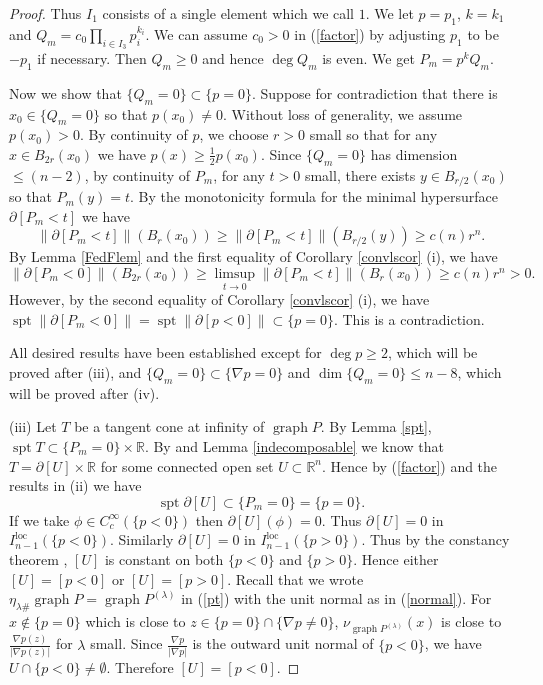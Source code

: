 \documentclass[pdflatex,sn-mathphys-num]{sn-jnl}%
\theoremstyle{thmstyleone}%
\theoremstyle{thmstyletwo}%
\theoremstyle{thmstylethree}%
\newcommand{\R}{\mathbb{R}}
\newcommand{\loc}{\mathrm{loc}}
\DeclareMathOperator{\spt}{spt}
\DeclareMathOperator{\graph}{graph}
\begin{document}
\begin{proof}
    
	Thus $I_1$ consists of a single element which we call $1$. We let $p=p_1$,  $k=k_1$ and $Q_m=c_0\prod_{i\in I_3}p_{i}^{k_{i}}$. We can assume $c_0>0$ in (\ref{factor}) by adjusting $p_1$ to be $-p_1$ if necessary. Then $Q_m\ge 0$ and hence $\deg Q_m$ is even. We get $P_m=p^kQ_m$.
	
	Now we show that $\{Q_m=0\}\subset \{p=0\}$. Suppose for contradiction that there is $x_0\in \{Q_m=0\}$ so that $p(x_0)\neq0$. Without loss of generality, we assume $p(x_0)>0$. By continuity of $p$, we choose $r>0$ small so that for any $x\in B_{2r}(x_0)$ we have $p(x)\ge \frac{1}{2}p(x_0)$. Since $\{Q_m=0\}$ has dimension $\le (n-2)$, by continuity of $P_m$, for any $t>0$ small, there exists $y\in B_{r/2}(x_0)$ so that $P_m(y)=t$. By the monotonicity formula for the minimal hypersurface $\partial [P_m<t]$ \cite[Theorem 17.6]{Sim} we have \[\|\partial [P_m<t]\|(B_r(x_0))\ge \|\partial [P_m<t]\|(B_{r/2}(y))\ge c(n)r^n.\]
	By Lemma \ref{FedFlem} and the first equality of Corollary \ref{convlscor} (i), we have
	\[\|\partial [P_m<0]\|(B_{2r}(x_0))\ge \limsup_{t\to0}\|\partial [P_m<t]\|(B_r(x_0))\ge c(n)r^n>0.\]
	However, by the second equality of Corollary \ref{convlscor} (i), we have $\spt \|\partial [P_m<0]\|=\spt \|\partial[p<0]\|\subset \{p=0\}$. This is a contradiction.
	
	
	All desired results have been established except for $\deg p \ge 2$, which will be proved after (iii), and $\{Q_m = 0\} \subset \{\nabla p = 0\}$ and $\dim \{Q_m=0\}\le n-8$, which will be proved after (iv).
	
	(iii) Let $T$ be a tangent cone at infinity of $\graph P$. By Lemma \ref{spt}, $\spt T\subset \{P_m=0\}\times \R$. By \cite[\S 2]{simon1987asymptotic} and Lemma \ref{indecomposable} we know that $T=\partial [U]\times \R$ for some connected open set $U\subset\R^n$. Hence by (\ref{factor}) and the results in (ii) we have \[\spt \partial [U]\subset \{P_m=0\}=\{p =0\}.\] If we take $\phi\in C_c^\infty(\{p <0\})$ then $\partial [U](\phi)=0$. Thus $\partial[U]=0$ in $I_{n-1}^\loc(\{p <0\})$. Similarly $\partial [U]=0$ in $I_{n-1}^\loc(\{p >0\})$. Thus by the constancy theorem \cite[Theorem 26.27]{Sim}, $[U]$ is constant on both $\{p <0\}$ and $\{p >0\}$. Hence either $[U]=[p <0]$ or $[U]=[p >0]$. Recall that we wrote $\eta_{\lambda\#}\graph P= \graph P^{(\lambda)}$ in (\ref{pt}) with the unit normal as in (\ref{normal}). For $x\notin \{p =0\}$ which is close to $z\in \{p=0\}\cap\{\nabla p\neq0\}$, $\nu_{\graph P^{(\lambda)}}(x)$ is close to  $\frac{\nabla p(z) }{|\nabla p(z) |}$ for $\lambda$ small. Since $\frac{\nabla p}{|\nabla p|}$ is the outward unit normal of $\{p<0\}$, we have $U\cap \{p <0\}\neq \emptyset$. Therefore $ [U]=[p <0]$.
	

\end{proof}
\end{document}

